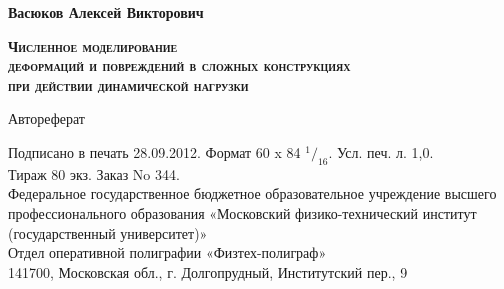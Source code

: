 \begin{center} \end{center}

\vspace{24em}

\begin{center}
\textbf{Васюков Алексей Викторович}
\end{center}

\vspace{1em}

\begin{center}
\textsc{\textbf{Численное моделирование\\
деформаций и повреждений в сложных конструкциях\\
при действии динамической нагрузки}}
\end{center}

\vspace{0.5em}

\begin{center}
Автореферат
\end{center}

\vspace{0.5em}

\begin{center}
\begin{singlespace}
Подписано в печать 28.09.2012. Формат 60 x 84 $^1/_{16}$. Усл. печ. л. 1,0.\\
Тираж 80 экз. Заказ No 344.\\
Федеральное государственное бюджетное образовательное учреждение высшего профессионального образования «Московский физико-технический
институт (государственный университет)»\\
Отдел оперативной полиграфии «Физтех-полиграф»\\
141700, Московская обл., г. Долгопрудный, Институтский пер., 9
\end{singlespace}
\end{center}
